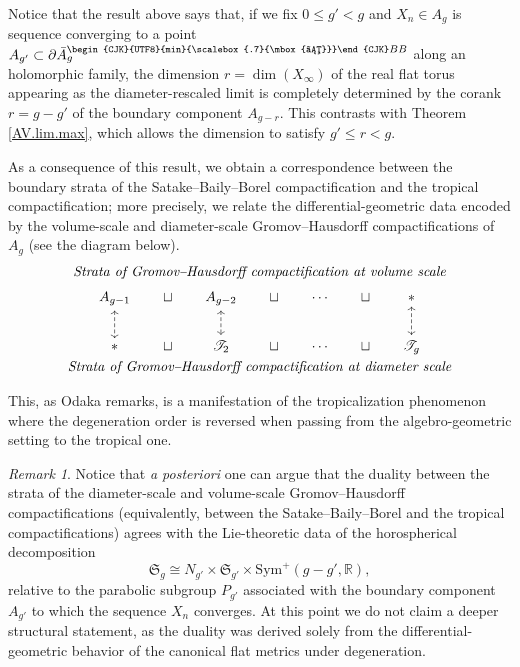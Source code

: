\documentclass[11pt]{amsart}
\theoremstyle{plain}
\theoremstyle{definition}
\theoremstyle{remark}
\newtheorem{remark}[theorem]{Remark}
\newcommand{\R}{\mathbb R}
\newcommand{\fS}{\mathfrak{S}}
\newcommand{\sym}{\mathrm{Sym}^{\!+}}
\newcommand{\sbb}{\text{\begin{CJK}{UTF8}{min}{\scalebox{.7}{\mbox{さ}}}\end{CJK}}BB}
\begin{document}
Notice that the result above says that, if we fix $0\leq g' <g$ and $X_n\in A_g$ is sequence converging to a point $A_{g'}\subset \partial \bar A_g^{\sbb}$ along an holomorphic family, the dimension $r=\dim(X_\infty)$ of the real flat torus appearing as the diameter-rescaled limit is completely determined by the corank $r=g-g'$ of the boundary component $A_{g-r}$. This contrasts with Theorem \ref{AV.lim.max}, which allows the dimension to satisfy $g'\leq r<g$. 

As a consequence of this result, we obtain a correspondence between the boundary strata of the Satake--Baily--Borel compactification and the tropical compactification; more precisely, we relate the differential-geometric data encoded by the volume-scale and diameter-scale Gromov--Hausdorff compactifications of $A_g$ (see the diagram below).
\[
\begin{array}{c}
\textit{Strata of Gromov--Hausdorff compactification at volume scale}\\[0.4em]
\begin{tikzcd}[column sep=1.5em]
A_{g-1} \arrow[d, leftrightarrow, dashed] & \sqcup &
A_{g-2} \arrow[d, leftrightarrow, dashed] & \sqcup &
\cdots & \sqcup &
* \arrow[d, leftrightarrow, dashed]\\
* & \sqcup & \mathscr{T}_{2} & \sqcup & \cdots & \sqcup & \mathscr{T}_{g}
\end{tikzcd}\\[0.4em]
\textit{Strata of Gromov--Hausdorff compactification at diameter scale}\\[0.4em]
\end{array}
\]
This, as Odaka remarks, is a manifestation of the tropicalization phenomenon where the degeneration order is reversed when passing from the algebro-geometric setting to the tropical one. 

\begin{remark}\label{rmk:sbb.trop.strata}
Notice that \emph{a posteriori} one can argue that the duality between the strata of the diameter-scale and volume-scale Gromov--Hausdorff compactifications (equivalently, between the Satake--Baily--Borel and the tropical compactifications) agrees with the Lie-theoretic data of the horospherical decomposition
\[
\fS_g \cong N_{g'} \times \fS_{g'} \times \sym(g-g',\R),
\]
relative to the parabolic subgroup $P_{g'}$ associated with the boundary component $A_{g'}$ to which the sequence $X_n$ converges. At this point we do not claim a deeper structural statement, as the duality was derived solely from the differential-geometric behavior of the canonical flat metrics under degeneration.
\end{remark}
  
\end{document}
